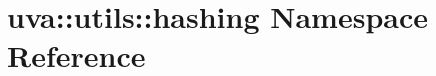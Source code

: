 \hypertarget{namespaceuva_1_1utils_1_1hashing}{}\section{uva\+:\+:utils\+:\+:hashing Namespace Reference}
\label{namespaceuva_1_1utils_1_1hashing}
